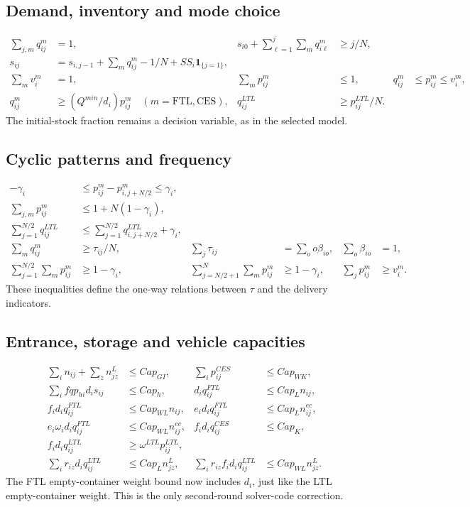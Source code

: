 \documentclass{article}
\begin{document}
\subsection*{Demand, inventory and mode choice}
\begin{align}
\sum_{j,m}q_{ij}^m&=1,&
s_{i0}+\sum_{\ell=1}^j\sum_mq_{i\ell}^m&\ge j/N,\\
s_{ij}&=s_{i,j-1}+\sum_mq_{ij}^m-1/N+SS_i\mathbf1_{\{j=1\}},\\
\sum_m v_i^m&=1,&
\sum_m p_{ij}^m&\le1,&
q_{ij}^m&\le p_{ij}^m\le v_i^m,\\
q_{ij}^m&\ge(Q^{min}/d_i)p_{ij}^m\quad(m=\mathrm{FTL},\mathrm{CES}),&
q_{ij}^{LTL}&\ge p_{ij}^{LTL}/N.
\end{align}
The initial-stock fraction remains a decision variable, as in the selected
model.

\subsection*{Cyclic patterns and frequency}
\begin{align}
-\gamma_i&\le p_{ij}^m-p_{i,j+N/2}^m\le\gamma_i,\\
\sum_{j,m}p_{ij}^m&\le1+N(1-\gamma_i),\\
\sum_{j=1}^{N/2}q_{ij}^{LTL}&\le
 \sum_{j=1}^{N/2}q_{i,j+N/2}^{LTL}+\gamma_i,\\
\sum_mq_{ij}^m&\ge\tau_{ij}/N,&
\sum_j\tau_{ij}&=\sum_o o\beta_{io},&
\sum_o\beta_{io}&=1,\\
\sum_{j=1}^{N/2}\sum_m p_{ij}^m&\ge1-\gamma_i,&
\sum_{j=N/2+1}^{N}\sum_m p_{ij}^m&\ge1-\gamma_i,&
\sum_jp_{ij}^m&\ge v_i^m.
\end{align}
These inequalities define the one-way relations between $\tau$ and the delivery indicators.

\subsection*{Entrance, storage and vehicle capacities}
\begin{align}
\sum_i n_{ij}+\sum_z n^L_{jz}&\le Cap_{GI},&
\sum_i p_{ij}^{CES}&\le Cap_{WK},\\
\sum_i fqp_{hi}d_i s_{ij}&\le Cap_h,&
d_iq_{ij}^{FTL}&\le Cap_L n_{ij},\\
f_i d_iq_{ij}^{FTL}&\le Cap_{WL}n_{ij},&
e_id_iq_{ij}^{FTL}&\le Cap_Ln^{ec}_{ij},\\
e_i\omega_i d_iq_{ij}^{FTL}&\le Cap_{WL}n^{ec}_{ij},&
f_id_iq_{ij}^{CES}&\le Cap_K,\\
f_id_iq_{ij}^{LTL}&\ge\omega^{LTL}p_{ij}^{LTL},\\
\sum_i r_{iz}d_iq_{ij}^{LTL}&\le Cap_Ln^L_{jz},&
\sum_i r_{iz}f_id_iq_{ij}^{LTL}&\le Cap_{WL}n^L_{jz}.
\end{align}
The FTL empty-container weight bound now includes $d_i$, just like the LTL
empty-container weight. This is the only second-round solver-code correction.
\end{document}
